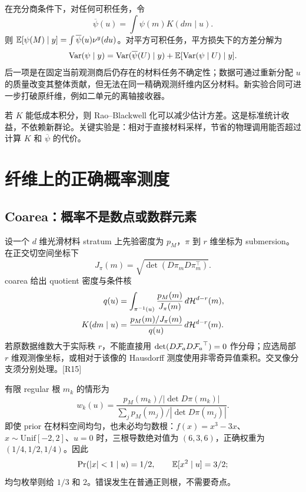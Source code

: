在充分商条件下，对任何可积任务，令
\begin{equation}
\overline\psi(u)=\int\psi(m)K(dm\mid u).
\end{equation}
则 $\mathbb E[\psi(M)\mid y]=\int\overline\psi(u)\nu^y(du)$。对平方可积任务，平方损失下的方差分解为
\begin{equation}
\operatorname{Var}(\psi\mid y)
=\operatorname{Var}(\overline\psi(U)\mid y)
+\mathbb E[\operatorname{Var}(\psi\mid U)\mid y].
\end{equation}
后一项是在固定当前观测商后仍存在的材料任务不确定性；数据可通过重新分配 $u$ 的质量改变其整体贡献，但无法在同一精确观测纤维内区分材料。新实验合同可进一步打破原纤维，例如二单元的离轴接收器。

若 $K$ 能低成本积分，则 Rao--Blackwell 化可以减少估计方差。这是标准统计收益，不依赖新群论。关键实验是：相对于直接材料采样，节省的物理调用能否超过计算 $K$ 和 $\overline\psi$ 的代价。

\section{纤维上的正确概率测度}

\subsection{Coarea：概率不是数点或数群元素}

设一个 $d$ 维光滑材料 stratum 上先验密度为 $p_M$，$\pi$ 到 $r$ 维坐标为 submersion。在正交切空间坐标下
\begin{equation}
J_\pi(m)=\sqrt{\det(D\pi_mD\pi_m^\top)}.
\end{equation}
coarea 给出 quotient 密度与条件核
\begin{align}
q(u)&=\int_{\pi^{-1}(u)}\frac{p_M(m)}{J_\pi(m)}\,d\mathcal H^{d-r}(m),\\
K(dm\mid u)&=\frac{p_M(m)/J_\pi(m)}{q(u)}\,d\mathcal H^{d-r}(m).\label{eq:coarea}
\end{align}
若原数据维数大于实际秩 $r$，不能直接用 $\det(D{\mathcal F_a} D{\mathcal F_a}^\top)=0$ 作分母；应选局部 $r$ 维观测像坐标，或相对于该像的 Hausdorff 测度使用非零奇异值乘积。交叉像分支须分别处理。[R15]

有限 regular 根 $m_k$ 的情形为
\begin{equation}
w_k(u)=\frac{p_M(m_k)/|\det D\pi(m_k)|}
{\sum_j p_M(m_j)/|\det D\pi(m_j)|}.\label{eq:root-weights}
\end{equation}
即使 prior 在材料空间均匀，也未必均匀数根：$f(x)=x^3-3x$、$x\sim\mathrm{Unif}[-2,2]$、$u=0$ 时，三根导数绝对值为 $(6,3,6)$，正确权重为 $(1/4,1/2,1/4)$。因此
\begin{equation}
\Pr(|x|<1\mid u)=1/2,\qquad \mathbb E[x^2\mid u]=3/2;
\end{equation}
均匀枚举则给 $1/3$ 和 $2$。错误发生在普通正则根，不需要奇点。

